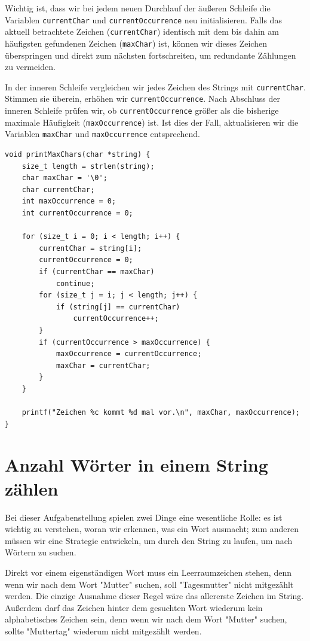 Wichtig ist, dass wir bei jedem neuen Durchlauf der äußeren Schleife die
Variablen \texttt{currentChar} und \texttt{currentOccurrence} neu
initialisieren. Falls das aktuell betrachtete Zeichen
(\texttt{currentChar}) identisch mit dem bis dahin am häufigsten
gefundenen Zeichen (\texttt{maxChar}) ist, können wir dieses Zeichen
überspringen und direkt zum nächsten fortschreiten, um redundante Zählungen zu
vermeiden.

In der inneren Schleife vergleichen wir jedes Zeichen des Strings mit
\texttt{currentChar}. Stimmen sie überein, erhöhen wir
\texttt{currentOccurrence}. Nach Abschluss der inneren Schleife prüfen
wir, ob \texttt{currentOccurrence} größer als die bisherige maximale
Häufigkeit (\texttt{maxOccurrence}) ist. Ist dies der Fall, aktualisieren
wir die Variablen \texttt{maxChar} und \texttt{maxOccurrence}
entsprechend.

\begin{verbatim}
void printMaxChars(char *string) {
    size_t length = strlen(string);
    char maxChar = '\0';
    char currentChar;
    int maxOccurrence = 0;
    int currentOccurrence = 0;

    for (size_t i = 0; i < length; i++) {
        currentChar = string[i];
        currentOccurrence = 0;
        if (currentChar == maxChar)
            continue;
        for (size_t j = i; j < length; j++) {
            if (string[j] == currentChar)
                currentOccurrence++;
        }
        if (currentOccurrence > maxOccurrence) {
            maxOccurrence = currentOccurrence;
            maxChar = currentChar;
        }
    }

    printf("Zeichen %c kommt %d mal vor.\n", maxChar, maxOccurrence);
}
\end{verbatim}





\chapter{Anzahl Wörter in einem String zählen}

Bei dieser Aufgabenstellung spielen zwei Dinge eine wesentliche Rolle: es ist
wichtig zu verstehen, woran wir erkennen, was ein Wort ausmacht; zum anderen
müssen wir eine Strategie entwickeln, um durch den String zu laufen, um nach
Wörtern zu suchen.

Direkt vor einem eigenständigen Wort muss ein Leerraumzeichen stehen, denn wenn
wir nach dem Wort "Mutter" suchen, soll "Tagesmutter" nicht mitgezählt werden.
Die einzige Ausnahme dieser Regel wäre das allererste Zeichen im String.
Außerdem darf das Zeichen hinter dem gesuchten Wort wiederum kein alphabetisches
Zeichen sein, denn wenn wir nach dem Wort "Mutter" suchen, sollte "Muttertag"
wiederum nicht mitgezählt werden.

